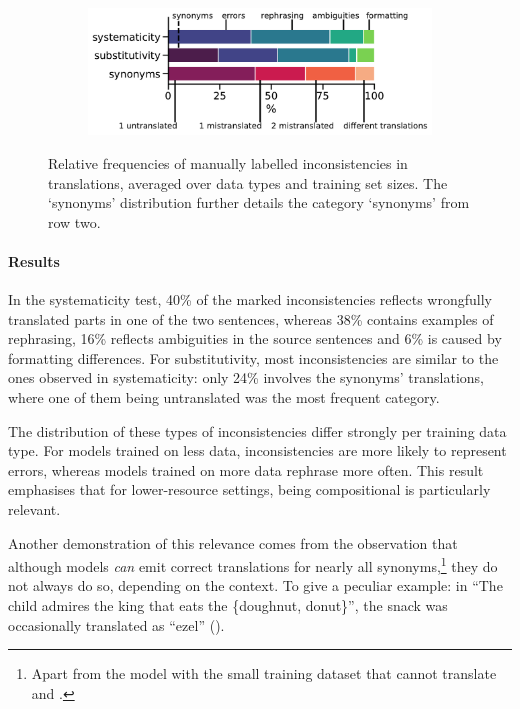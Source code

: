 \begin{figure}
	\begin{subfigure}[b]{\columnwidth}
		\includegraphics[width=\textwidth]{figures/analysis_appendix/summary_analysis.pdf}
	\end{subfigure}
	\caption{Relative frequencies of manually labelled inconsistencies in translations, averaged over data types and training set sizes.
	         The `synonyms' distribution further details the category `synonyms' from row two.}
	\label{fig:manual_analysis_summary}
	\vspace{-.3cm}
\end{figure}


\paragraph{Results}
In the systematicity test, 40\% of the marked inconsistencies reflects wrongfully translated parts in one of the two sentences, whereas 38\% contains examples of rephrasing, 16\% reflects ambiguities in the source sentences and 6\% is caused by formatting differences. 
For substitutivity, most inconsistencies are similar to the ones observed in systematicity: only 24\% involves the synonyms' translations, where one of them being untranslated was the most frequent category.
 
The distribution of these types of inconsistencies differ strongly per training data type.
For models trained on less data, inconsistencies are more likely to represent errors, whereas models trained on more data rephrase more often. 
This result emphasises that for lower-resource settings, being compositional is particularly relevant.

Another demonstration of this relevance comes from the observation that although models \textit{can} emit correct translations for nearly all synonyms,\footnote{Apart from the model with the small training dataset that cannot translate  and .}
they do not always do so, depending on the context.
To give a peculiar example: in ``The child admires the king that eats the \{doughnut, donut\}'', the snack was occasionally translated as ``ezel'' ().

